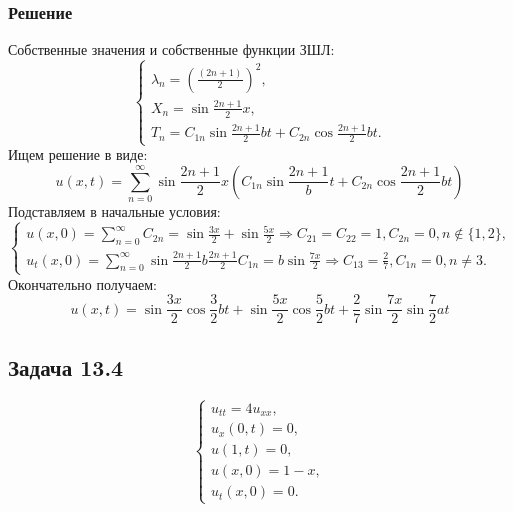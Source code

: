 \documentclass[11pt]{article}
\begin{document}
\subsubsection{Решение}
\label{sec:org4e34c70}
Собственные значения и собственные функции ЗШЛ:
\begin{equation}
\begin{cases}
\lambda_n = \left(\frac{(2n + 1)}2\right)^2, \\
X_n = \sin\frac{2n + 1}2x, \\
T_n = C_{1n}\sin\frac{2n + 1}2bt + C_{2n}\cos\frac{2n + 1}2bt.
\end{cases}
\end{equation}
Ищем решение в виде:
\begin{equation}
u(x, t) = \sum_{n = 0}^{\infty}\sin\frac{2n + 1}2x\left(C_{1n}\sin\frac{2n + 1}bt +
C_{2n}\cos\frac{2n + 1}2bt\right)
\end{equation}
Подставляем в начальные условия:
\begin{equation}
\begin{cases}
u(x, 0) = \sum_{n = 0}^{\infty}C_{2n} = \sin\frac{3x}2 + \sin\frac{5x}2 \Rightarrow C_{21} = C_{22} = 1, C_{2n} = 0, n \notin \{1, 2\}, \\
u_t(x, 0) = \sum_{n = 0}^{\infty}\sin\frac{2n + 1}2b\frac{2n + 1}2C_{1n} = b\sin\frac{7x}2 \Rightarrow C_{13} = \frac27, C_{1n} = 0, n \neq 3.
\end{cases}
\end{equation}
Окончательно получаем:
\begin{equation}
u(x, t) = \sin\frac{3x}2\cos\frac32bt + \sin\frac{5x}2\cos\frac52bt + \frac27\sin\frac{7x}2\sin\frac72at
\end{equation}
\subsection{Задача 13.4}
\label{sec:orgc43e906}
\begin{equation}
\begin{cases}
u_{tt} = 4u_{xx}, \\
u_x(0, t) = 0, \\
u(1, t) = 0, \\
u(x, 0) = 1 - x, \\
u_t(x, 0) = 0.
\end{cases}
\end{equation}
\end{document}
